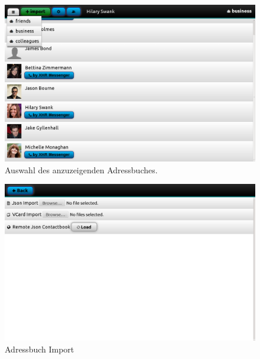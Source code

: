 	\begin{figure}[H]
		\centering
		\includegraphics[height=0.4\textheight]{../ui/img/finalUi/contactView2.png}
		\caption[Contactbook list screen]{Auswahl des anzuzeigenden Adressbuches.\\
		}
		\label{contactbook change}
	\end{figure}
	\begin{figure}[H]
		\centering
		\includegraphics[height=0.4\textheight]{../ui/img/finalUi/importView.png}
		\caption[Contactbook import screen]{Adressbuch Import}
		\label{contactbook import screen}
	\end{figure}
